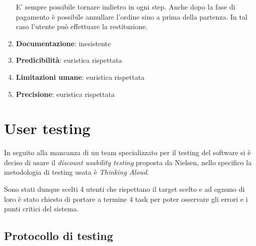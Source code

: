 \documentclass[12pt,italian,]{report}
\begin{document}
\begin{enumerate}
  E' sempre possibile tornare indietro in ogni step. Anche dopo la fase di pagamento è possibile annullare l'ordine sino a prima della partenza. In tal caso l'utente può effettuare la restituzione.
\item
  \textbf{Documentazione}: inesistente
\item
  \textbf{Predicibilità}: euristica rispettata
\item
  \textbf{Limitazioni umane}: euristica rispettata
\item
  \textbf{Precisione}: euristica rispettata
\end{enumerate}

\section{User testing}\label{user-testing}

In seguito alla mancanza di un team specializzato per il testing del
software si è deciso di usare il \emph{discount usability testing}
proposta da Nielsen, nello specifico la metodologia di testing usata è
\emph{Thinking Aloud}.

Sono stati dunque scelti 4 utenti che rispettano il target scelto e ad
ognuno di loro è stato chiesto di portare a termine 4 task per poter
osservare gli errori e i punti critici del sistema.

\subsection{Protocollo di testing}\label{protocollo-di-testing}
\end{document}
